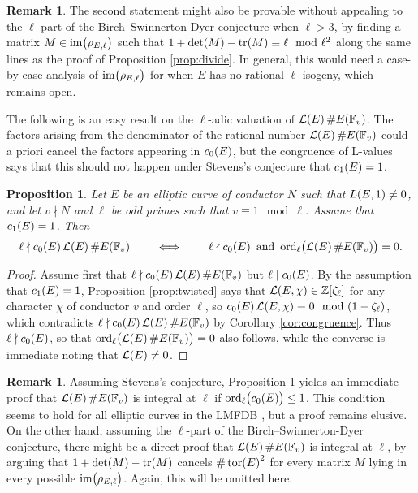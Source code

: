 \documentclass{article}
\theoremstyle{plain}
\newtheorem{proposition}[n]{Proposition}
\theoremstyle{definition}
\newtheorem{remark}[n]{Remark}
\newcommand{\FF}{\mathbb{F}}
\newcommand{\im}{\operatorname{im}}
\newcommand{\LLL}{\mathcal{L}}
\newcommand{\ord}{\operatorname{ord}}
\newcommand{\tor}{\operatorname{tor}}
\newcommand{\tr}{\operatorname{tr}}
\newcommand{\ZZ}{\mathbb{Z}}
\newcommand{\br}{\!\del}
\begin{document}
\begin{remark}
The second statement might also be provable without appealing to the $ \ell $-part of the Birch--Swinnerton-Dyer conjecture when $ \ell > 3 $, by finding a matrix $ M \in \im\br{\rho_{E, \ell}} $ such that $ 1 + \det\br{M} - \tr\br{M} \equiv \ell \mod \ell^2 $ along the same lines as the proof of Proposition \ref{prop:divide}. In general, this would need a case-by-case analysis of $ \im\br{\rho_{E, \ell}} $ for when $ E $ has no rational $ \ell $-isogeny, which remains open.
\end{remark}

The following is an easy result on the $ \ell $-adic valuation of $ \LLL\br{E}\#E\br{\FF_v} $. The factors arising from the denominator of the rational number $ \LLL\br{E}\#E\br{\FF_v} $ could a priori cancel the factors appearing in $ c_0\br{E} $, but the congruence of L-values says that this should not happen under Stevens's conjecture that $ c_1\br{E} = 1 $.

\begin{proposition}
\label{prop:valuation}
Let $ E $ be an elliptic curve of conductor $ N $ such that $ L\br{E, 1} \ne 0 $, and let $ v \nmid N $ and $ \ell $ be odd primes such that $ v \equiv 1 \mod \ell $. Assume that $ c_1\br{E} = 1 $. Then
$$ \ell \nmid c_0\br{E}\LLL\br{E}\#E\br{\FF_v} \qquad \iff \qquad \ell \nmid c_0\br{E} \ \text{and} \ \ord_\ell\br[1]{\LLL\br{E}\#E\br{\FF_v}} = 0. $$
\end{proposition}

\begin{proof}
Assume first that $ \ell \nmid c_0\br{E}\LLL\br{E}\#E\br{\FF_v} $ but $ \ell \mid c_0\br{E} $. By the assumption that $ c_1\br{E} = 1 $, Proposition \ref{prop:twisted} says that $ \LLL\br{E, \chi} \in \ZZ\sbr[0]{\zeta_\ell} $ for any character $ \chi $ of conductor $ v $ and order $ \ell $, so $ c_0\br{E}\LLL\br{E, \chi} \equiv 0 \mod \br{1 - \zeta_\ell} $, which contradicts $ \ell \nmid c_0\br{E}\LLL\br{E}\#E\br{\FF_v} $ by Corollary \ref{cor:congruence}. Thus $ \ell \nmid c_0\br{E} $, so that $ \ord_\ell\br[1]{\LLL\br{E}\#E\br{\FF_v}} = 0 $ also follows, while the converse is immediate noting that $ \LLL\br{E} \ne 0 $.
\end{proof}

\begin{remark}
Assuming Stevens's conjecture, Proposition \ref{prop:valuation} yields an immediate proof that $ \LLL\br{E}\#E\br{\FF_v} $ is integral at $ \ell $ if $ \ord_\ell\br{c_0\br{E}} \le 1 $. This condition seems to hold for all elliptic curves in the LMFDB \cite{Col}, but a proof remains elusive. On the other hand, assuming the $ \ell $-part of the Birch--Swinnerton-Dyer conjecture, there might be a direct proof that $ \LLL\br{E}\#E\br{\FF_v} $ is integral at $ \ell $, by arguing that $ 1 + \det\br{M} - \tr\br{M} $ cancels $ \#\tor\br{E}^2 $ for every matrix $ M $ lying in every possible $ \im\br{\rho_{E, \ell}} $. Again, this will be omitted here.
\end{remark}
\end{document}
